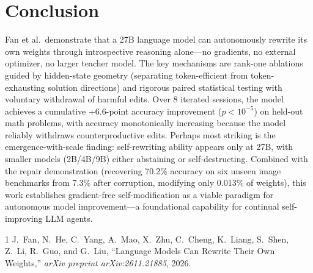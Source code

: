 \documentclass[11pt,a4paper]{article}
\begin{document}
\section{Conclusion}
Fan et al.\ demonstrate that a 27B language model can autonomously rewrite its own weights through introspective reasoning alone---no gradients, no external optimizer, no larger teacher model. The key mechanisms are rank-one ablations guided by hidden-state geometry (separating token-efficient from token-exhausting solution directions) and rigorous paired statistical testing with voluntary withdrawal of harmful edits. Over 8 iterated sessions, the model achieves a cumulative +6.6-point accuracy improvement ($p < 10^{-5}$) on held-out math problems, with accuracy monotonically increasing because the model reliably withdraws counterproductive edits. Perhaps most striking is the emergence-with-scale finding: self-rewriting ability appears only at 27B, with smaller models (2B/4B/9B) either abstaining or self-destructing. Combined with the repair demonstration (recovering 70.2\% accuracy on six unseen image benchmarks from 7.3\% after corruption, modifying only 0.013\% of weights), this work establishes gradient-free self-modification as a viable paradigm for autonomous model improvement---a foundational capability for continual self-improving LLM agents.

\begin{thebibliography}{1}
J.~Fan, N.~He, C.~Yang, A.~Mao, X.~Zhu, C.~Cheng, K.~Liang, S.~Shen, Z.~Li, R.~Guo, and G.~Liu,
``Language Models Can Rewrite Their Own Weights,''
\textit{arXiv preprint arXiv:2611.21885}, 2026.
\end{thebibliography}
\end{document}
